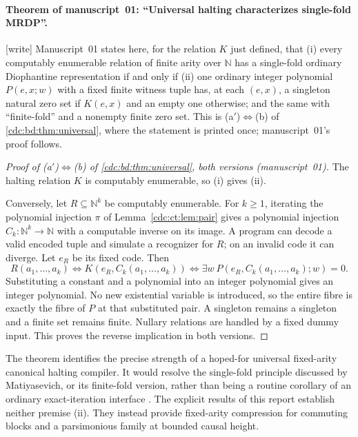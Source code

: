 \documentclass[11pt,a4paper]{article}
\theoremstyle{definition}
\theoremstyle{remark}
\newcommand{\N}{\mathbb N}
\newcommand{\wtag}{\textup{[write]}}%
\begin{document}
\paragraph{Theorem of manuscript~01: ``Universal halting characterizes single-fold MRDP''.} \wtag{} Manuscript~01 states here, for the relation $K$ just defined, that (i) every computably enumerable relation of finite arity over $\N$ has a single-fold ordinary Diophantine representation if and only if (ii) one ordinary integer polynomial $P(e,x;w)$ with a fixed finite witness tuple has, at each $(e,x)$, a singleton natural zero set if $K(e,x)$ and an empty one otherwise; and the same with ``finite-fold'' and a nonempty finite zero set. This is (a$'$)$\Leftrightarrow$(b) of \cref{cdc:bd:thm:universal}, where the statement is printed once; manuscript~01's proof follows.

\begin{proof}[Proof of (a$'$)$\Leftrightarrow$(b) of \cref{cdc:bd:thm:universal}, both versions (manuscript~01)]
The halting relation $K$ is computably enumerable, so (i) gives (ii).

Conversely, let $R\subseteq\N^k$ be computably enumerable. For $k\ge1$, iterating the polynomial injection $\pi$ of Lemma~\ref{cdc:ct:lem:pair} gives a polynomial injection $C_k:\N^k\to\N$ with a computable inverse on its image. A program can decode a valid encoded tuple and simulate a recognizer for $R$; on an invalid code it can diverge. Let $e_R$ be its fixed code. Then
\[
 R(a_1,\ldots,a_k)
 \iff K(e_R,C_k(a_1,\ldots,a_k))
 \iff\exists w\ P(e_R,C_k(a_1,\ldots,a_k);w)=0.
\]
Substituting a constant and a polynomial into an integer polynomial gives an integer polynomial. No new existential variable is introduced, so the entire fibre is exactly the fibre of $P$ at that substituted pair. A singleton remains a singleton and a finite set remains finite. Nullary relations are handled by a fixed dummy input. This proves the reverse implication in both versions.
\end{proof}
The theorem identifies the precise strength of a hoped-for universal fixed-arity canonical halting compiler. It would resolve the single-fold principle discussed by Matiyasevich, or its finite-fold version, rather than being a routine corollary of an ordinary exact-iteration interface \cite{mat2010,ccfo2019}. The explicit results of this report establish neither premise (ii). They instead provide fixed-arity compression for commuting blocks and a parsimonious family at bounded causal height.
\end{document}
